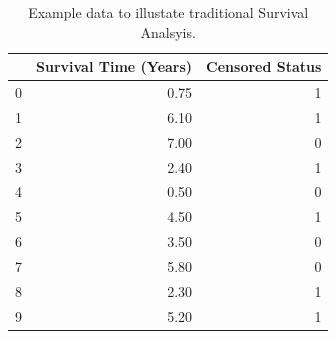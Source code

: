 \documentclass[10pt,letterpaper]{article}
\begin{document}
\begin{table}[!ht]
\begin{adjustwidth}{-2.25in}{0in} %
\caption{\label{tab:censoredexample} Example data to illustate traditional Survival Analsyis.}
\begin{tabular}{lrr}
\toprule
{} &  Survival Time (Years) &  Censored Status \\
\midrule
0 &            0.75 &                1 \\
1 &            6.10 &                1 \\
2 &            7.00 &                0 \\
3 &            2.40 &                1 \\
4 &            0.50 &                0 \\
5 &            4.50 &                1 \\
6 &            3.50 &                0 \\
7 &            5.80 &                0 \\
8 &            2.30 &                1 \\
9 &            5.20 &                1 \\
\bottomrule
\end{tabular}
\end{adjustwidth}
\end{table}
\end{document}
